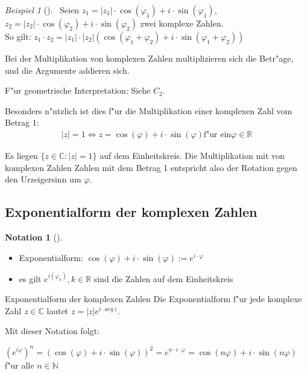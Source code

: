 \documentclass[11pt]{article}
\theoremstyle{remark}
\newtheorem{exa}{Beispiel}[section]
\theoremstyle{definition}
\newtheorem*{notation}{Notation}
\theoremstyle{remark}
\begin{document}
\begin{exa}[] \label{} \
Seien \(z_1=|z_1|\cdot \cos(\varphi_1)+i\cdot \sin(\varphi_1)\), \(z_2=|z_2|\cdot
\cos(\varphi_2)+i\cdot \sin(\varphi_2)\) zwei komplexe Zahlen.\\

So gilt: \(z_1\cdot z_2 = |z_1|\cdot |z_2|(\cos(\varphi_1+\varphi_2)+i\cdot \sin(\varphi_1 +
\varphi_2))\)
\end{exa}

\begin{relation}
Bei der Multiplikation von komplexen Zahlen multiplizieren sich die Betr"age,
und die Argumente addieren sich.
\end{relation}

F"ur geometrische Interpretation: Siehe \(C_2\).

Besonders n"utzlich ist dies f"ur die Multiplikation einer komplexen Zahl vom
Betrag \(1\):
\begin{align*}
|z|=1\iff z=\cos(\varphi)+i\cdot \sin(\varphi) \text{f"ur ein} \varphi \in \mathbb{R}
\end{align*}

\begin{relation}
Es liegen \(\{z\in \mathbb{C} : |z|=1\}\) auf dem Einheitskreis.
Die Multiplikation mit von komplexen Zahlen Zahlen mit dem Betrag 1 entspricht
also der Rotation gegen den Urzeigersinn um \(\varphi\).
\end{relation}

\subsection{Exponentialform der komplexen Zahlen}
\label{sec:orgb4d9f14}
\begin{notation}[] \label{} \
\begin{itemize}
\item Exponentialform: \(\cos(\varphi)+i\cdot \sin(\varphi):=e^{i\cdot \varphi}\)
\item es gilt \(e^{i(\varphi_k)}, k\in\mathbb{R}\) sind die Zahlen auf dem Einheitskreis
\end{itemize}
\end{notation}

\begin{definition}{Exponentialform der komplexen Zahlen}{}
Die Exponentialform f"ur jede komplexe Zahl \(z\in\mathbb{C}\) lautet \(z=|z|e^{i\cdot arg\,z}\).
\end{definition}

Mit dieser Notation folgt:
\begin{relation}
\((e^{i\varphi})^n=(\cos(\varphi)+i\cdot\sin(\varphi))^2=e^{n\cdot i\cdot
 \varphi}=\cos(n\varphi)+i\cdot\sin(n\varphi)\) f"ur alle \(n\in\mathbb{N}\)
\end{relation}
\end{document}
